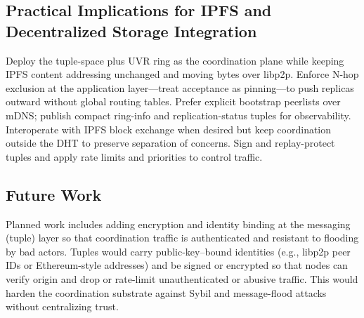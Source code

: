 \documentclass[runningheads]{llncs}
\begin{document}
\subsection{Practical Implications for IPFS and Decentralized Storage Integration}
Deploy the tuple-space plus UVR ring as the coordination plane while keeping IPFS content addressing unchanged and moving bytes over libp2p. Enforce N-hop exclusion at the application layer—treat acceptance as pinning—to push replicas outward without global routing tables. Prefer explicit bootstrap peerlists over mDNS; publish compact ring-info and replication-status tuples for observability. Interoperate with IPFS block exchange when desired but keep coordination outside the DHT to preserve separation of concerns. Sign and replay-protect tuples and apply rate limits and priorities to control traffic.

\subsection{Future Work}
Planned work includes adding encryption and identity binding at the messaging (tuple) layer so that coordination traffic is authenticated and resistant to flooding by bad actors. Tuples would carry public-key–bound identities (e.g., libp2p peer IDs or Ethereum-style addresses) and be signed or encrypted so that nodes can verify origin and drop or rate-limit unauthenticated or abusive traffic. This would harden the coordination substrate against Sybil and message-flood attacks without centralizing trust.

\end{document}
